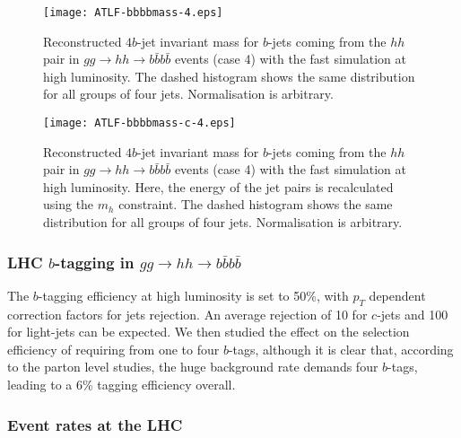 \begin{figure}[!ht]
\vspace*{-9mm}
\begin{center}
  \texttt{[image: ATLF-bbbbmass-4.eps]} 
  \caption{Reconstructed $4b$-jet invariant mass for
$b$-jets coming from the $hh$ pair in $gg\to hh\to b\bar bb\bar b$ events
(case 4) with the fast simulation at high luminosity.
The dashed histogram shows the same distribution for all groups of four jets.
Normalisation is arbitrary.}
  \label{ATLF-bbbbmass-4}
\end{center}
\vspace*{-5mm}
\end{figure}

\begin{figure}[!ht]
\vspace*{-9mm}
\begin{center}
  \texttt{[image: ATLF-bbbbmass-c-4.eps]} 
  \caption{Reconstructed $4b$-jet invariant mass for
$b$-jets coming from the $hh$ pair in $gg\to hh\to b\bar bb\bar b$ events 
(case 4) with the fast simulation at high luminosity. Here, the 
energy of the jet pairs is recalculated using the $m_h$ constraint.
The dashed histogram shows the same distribution for all groups of four jets.
Normalisation is arbitrary.}
  \label{ATLF-bbbbmass-c-4}
\vspace*{-5mm}
\end{center}
\end{figure}

\subsubsection{LHC $b$-tagging in $gg\to hh\to b\bar{b}b\bar{b}$}

The $b$-tagging efficiency at high luminosity is set to 50\%,
with $p_T$ dependent correction factors for jets rejection. An average
rejection of 10 for $c$-jets and 100 for light-jets can be expected. We then
studied the effect on the selection efficiency of requiring from one
to four $b$-tags, although it is clear that, according to the parton
level studies, the huge background rate demands four $b$-tags, leading
to a 6\% tagging efficiency overall.

\subsubsection{Event rates at the LHC}

